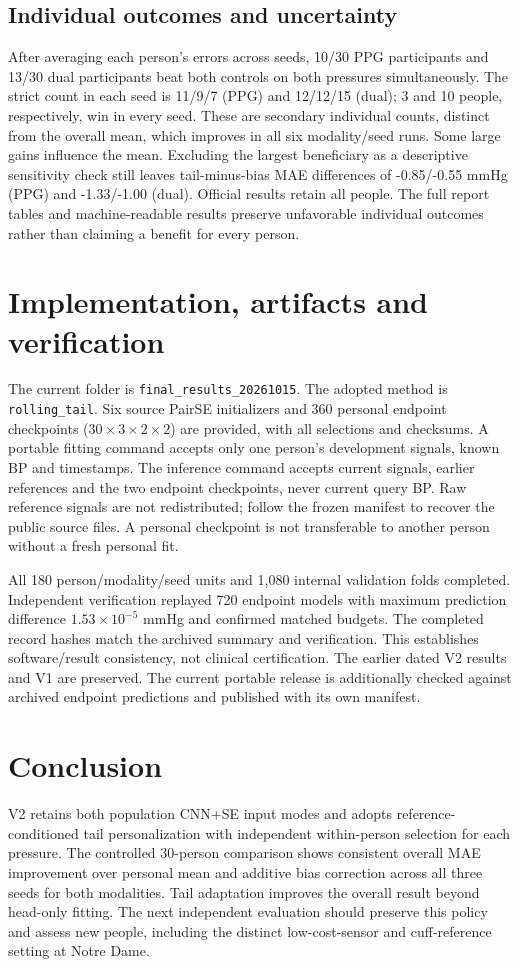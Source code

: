 \documentclass[conference]{IEEEtran}
\begin{document}
\subsection{Individual outcomes and uncertainty}
After averaging each person's errors across seeds, 10/30 PPG participants and
13/30 dual participants beat both controls on both pressures simultaneously.
The strict count in each seed is 11/9/7 (PPG) and 12/12/15 (dual); 3 and 10
people, respectively, win in every seed. These are secondary individual counts,
distinct from the overall mean, which improves in all six modality/seed runs.
Some large gains influence the mean. Excluding the largest beneficiary as a
descriptive sensitivity check still leaves tail-minus-bias MAE differences of
-0.85/-0.55 mmHg (PPG) and -1.33/-1.00 (dual). Official results retain all people.
The full report tables and machine-readable results preserve unfavorable
individual outcomes rather than claiming a benefit for every person.

\section{Implementation, artifacts and verification}
The current folder is \texttt{final\_results\_20261015}. The adopted method is
\texttt{rolling\_tail}. Six source PairSE initializers and 360 personal endpoint
checkpoints ($30\times3\times2\times2$) are provided, with all selections and
checksums. A portable fitting command accepts only one person's development
signals, known BP and timestamps. The inference command accepts current signals,
earlier references and the two endpoint checkpoints, never current query BP.
Raw reference signals are not redistributed; follow the frozen manifest to
recover the public source files. A personal checkpoint is not transferable to
another person without a fresh personal fit.

All 180 person/modality/seed units and 1,080 internal validation folds completed.
Independent verification replayed 720 endpoint models with maximum prediction
difference $1.53\times10^{-5}$ mmHg and confirmed matched budgets. The completed
record hashes match the archived summary and verification. This establishes
software/result consistency, not clinical certification. The earlier dated V2
results and V1 are preserved. The current portable release is additionally
checked against archived endpoint predictions and published with its own manifest.

\section{Conclusion}
V2 retains both population CNN+SE input modes and adopts reference-conditioned
tail personalization with independent within-person selection for each pressure.
The controlled 30-person comparison shows consistent overall MAE improvement
over personal mean and additive bias correction across all three seeds for both
modalities. Tail adaptation improves the overall result beyond head-only fitting.
The next independent evaluation should preserve this policy and assess new people,
including the distinct low-cost-sensor and cuff-reference setting at Notre Dame.
\end{document}
